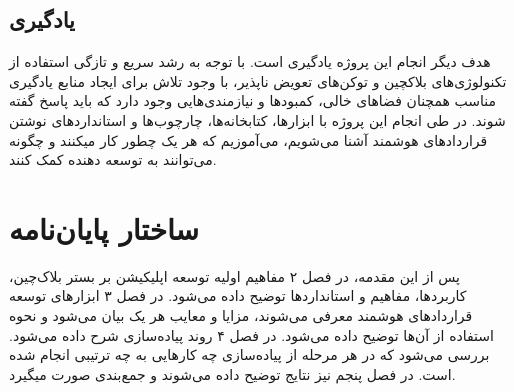 \subsection{یادگیری}
هدف دیگر انجام این پروژه یادگیری است.
با توجه به رشد سریع و تازگی استفاده از تکنولوژی‌های بلاکچین و توکن‌های تعویض ناپذیر،
با وجود تلاش برای ایجاد منابع یادگیری مناسب همچنان فضاهای خالی، کمبودها و نیازمندی‌هایی وجود دارد که باید پاسخ گفته شوند.
در طی انجام این پروژه با ابزارها، کتابخانه‌ها، چارچوب‌ها و استانداردهای نوشتن قراردادهای هوشمند آشنا می‌شویم،
می‌آموزیم که هر یک چطور کار میکنند و چگونه می‌توانند به توسعه دهنده کمک کنند.

\section{ساختار پایان‌نامه}
پس از این مقدمه، در فصل ۲ مفاهیم اولیه توسعه اپلیکیشن بر بستر بلاک‌چین، کاربردها، مفاهیم و استاندارد‌ها توضیح داده می‌شود.
در فصل ۳ ابزار‌های توسعه قرارداد‌های هوشمند معرفی می‌شوند،
مزایا و معایب هر یک بیان می‌شود و نحوه استفاده از آن‌ها توضیح داده می‌شود.
در فصل ۴ روند پیاده‌سازی شرح داده می‌شود. بررسی می‌شود که در هر مرحله از پیاده‌سازی چه کارهایی به چه ترتیبی انجام شده است.
در فصل پنجم نیز نتایج توضیح داده می‌شوند و جمع‌بندی صورت میگیرد.
